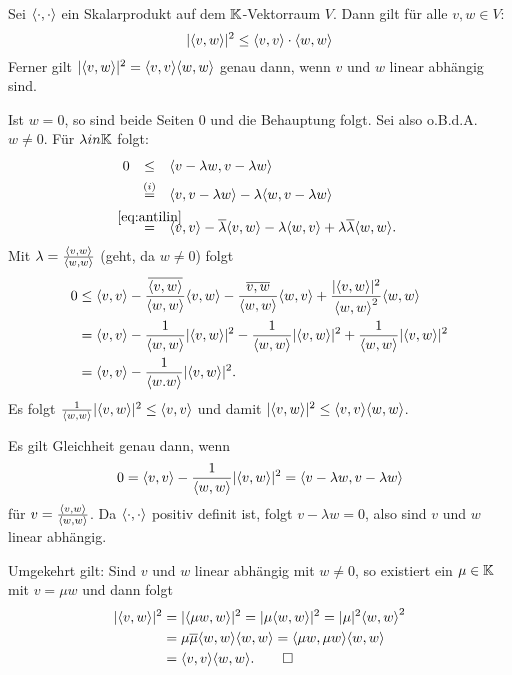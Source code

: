 \begin{satz}
	\label{satz:3.4}
	Sei $\left\langle\cdot,\cdot\right\rangle$ ein Skalarprodukt auf dem $\mathbb{K}$-Vektorraum $V$.
	Dann gilt für alle $v,w \in V$: 
	\[
		\lvert\left\langle v,w\right\rangle\rvert^2 \leq \left\langle v,v\right\rangle \cdot \left\langle w,w\right\rangle
	\]
	Ferner gilt $\abs{\sk{v,w}}^2 = \sk{v,v} \sk{w,w}$ genau dann, wenn $v$ und $w$ linear abhängig sind.
\end{satz}

\begin{beweis}
	Ist $w = 0$, so sind beide Seiten $0$ und die Behauptung folgt.
	Sei also o.B.d.A. $w \neq 0$.
	Für $\lambda in \mathbb{K}$ folgt:
	\begin{align*}
		0 &\stack{}{\leq} \sk{v-\lambda w, v - \lambda w} \\
		&\stack{(i)}{=} \sk{v,v-\lambda w} - \lambda \sk{w,v-\lambda w} \\
		&\stack{\eqref{eq:antilin}}{=} \sk{v,v} - \ol{\lambda} \sk{v,w} - \lambda \sk{w,v} + \lambda \ol{\lambda} \sk{w,w}.
	\end{align*}
	Mit $\lambda = \frac{\left\langle v,w\right\rangle}{\left\langle w,w\right\rangle}$ (geht, da $w \neq 0$) folgt
	\begin{align*}
		0 &\leq \sk{v,v} - \frac{\ol{\sk{v,w}}}{\sk{w,w}} \sk{v,w} - \frac{\ol{v,w}}{\sk{w,w}} \sk{w,v} + \frac{\abs{\sk{v,w}}^2}{\sk{w,w}^2} \sk{w,w} \\
		&= \sk{v,v} - \frac{1}{\sk{w,w}} \abs{\sk{v,w}}^2 - \frac{1}{\sk{w,w}} \abs{\sk{v,w}}^2 + \frac{1}{\sk{w,w}} \abs{\sk{v,w}}^2 \\
		&= \sk{v,v} - \frac{1}{\sk{w.w}} \abs{\sk{v,w}}^2.
	\end{align*}
	Es folgt $\frac{1}{\left\langle w,w\right\rangle} \lvert\left\langle v,w\right\rangle\rvert^2 \leq \left\langle v,v\right\rangle$ und damit $\abs{\sk{v,w}}^2 \leq \sk{v,v} \sk{w,w}$.
	
	Es gilt Gleichheit genau dann, wenn
	\[
		0 = \left\langle v,v\right\rangle - \frac{1}{\left\langle w,w\right\rangle} \lvert\left\langle v,w\right\rangle\rvert^2 = \left\langle v- \lambda w, v-\lambda w\right\rangle
	\]
	für $v = \frac{\left\langle v,w\right\rangle}{\left\langle w,w\right\rangle}$.
	Da $\left\langle\cdot,\cdot\right\rangle$ positiv definit ist, folgt $v - \lambda w = 0$, also sind $v$ und $w$ linear abhängig.
	
	Umgekehrt gilt:
	Sind $v$ und $w$ linear abhängig mit $w \neq 0$, so existiert ein $\mu \in \mathbb{K}$ mit $v = \mu w$ und dann folgt
	\begin{align*}
		\abs{\sk{v,w}}^2 &= \abs{\sk{\mu w,w}}^2 = \abs{\mu \sk{w,w}}^2 = \abs{\mu}^2 \sk{w,w}^2 \\
		&= \mu \ol{\mu} \sk{w,w} \sk{w,w} = \sk{\mu w, \mu w} \sk{w,w} \\
		&= \sk{v,v} \sk{w,w}. \qedhere
	\end{align*}
\end{beweis}

